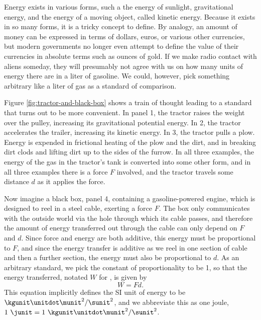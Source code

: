 Energy exists in various forms, such a the energy of sunlight,
gravitational energy, and the energy of a moving object,
called kinetic energy.
Because it exists in so many forms, it is a tricky concept to
define. By analogy, an amount of money can be expressed in terms
of dollars, euros, or various other currencies, but modern governments
no longer even attempt to define the value of their currencies in absolute
terms such as ounces of gold. If we make radio contact with aliens someday,
they will presumably not agree with us on how many units of energy there
are in a liter of gasoline. We could, however, pick something arbitrary
like a liter of gas as a standard of comparison.


Figure \ref{fig:tractor-and-black-box} shows a train of thought leading
to a standard that turns out to be more convenient. In panel 1,
the tractor raises the weight over
      the pulley, increasing its gravitational
      potential energy. In 2, the tractor accelerates the trailer,
      increasing its kinetic energy.
In 3, the tractor pulls a plow. Energy is
      expended in frictional heating of the
      plow and the dirt, and in breaking dirt
      clods and lifting dirt up to the sides of
      the furrow.
In all three examples, the energy of the gas in the tractor's tank is converted
into some other form, and in all three examples there is a force $F$ involved,
and the tractor travels some distance $d$ as it applies the force.

Now imagine a black box, panel 4, containing a gasoline-powered
engine, which is designed to reel in a steel cable, exerting a force $F$.
The box only communicates with the outside world via the hole through which its
cable passes, and therefore the amount of energy transferred out through the cable
can only depend on $F$ and $d$. Since force and energy are both additive, this
energy must be proportional to $F$, and since the energy transfer is additive
as we reel in one section of cable and then a further section, the energy
must also be proportional to $d$. As an arbitrary standard, we pick the constant
of proportionality to be 1, so that the energy transferred, notated $W$ for ,
is given by
\begin{equation}\label{eqn:work}
  W = Fd.
\end{equation}
This equation implicitly defines the SI unit of energy to be $\kgunit\unitdot\munit^2/\sunit^2$,
and we abbreviate this as one joule, $1\ \junit=1\ \kgunit\unitdot\munit^2/\sunit^2$.

